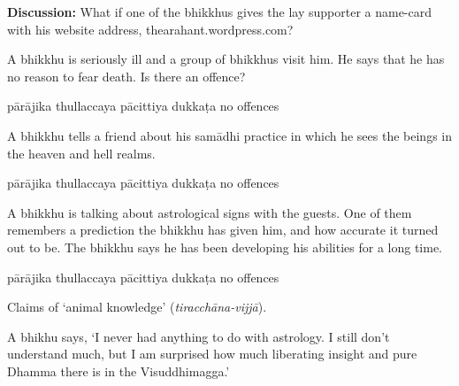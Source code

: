 \begin{exam}{\autoExamName}
\begin{problem*}
\begin{parts}
  \bigskip

  \textbf{Discussion:} What if one of the bhikkhus gives the lay supporter a
  name-card with his website address, thearahant.wordpress.com?

  \bigskip

\item A bhikkhu is seriously ill and a group of bhikkhus visit him. He says that
  he has no reason to fear death. Is there an offence?

  \bigskip

  \begin{answers}{5}
    \bChoices
     pārājika\eAns
     thullaccaya\eAns
     pācittiya\eAns
     dukkaṭa\eAns
     no offences\eAns
    \eChoices
  \end{answers}

  \bigskip

\item A bhikkhu tells a friend about his samādhi practice in which he sees the
  beings in the heaven and hell realms.

  \bigskip

  \begin{answers}{5}
    \bChoices
     pārājika\eAns
     thullaccaya\eAns
     pācittiya\eAns
     dukkaṭa\eAns
     no offences\eAns
    \eChoices
  \end{answers}

  \bigskip

\item A bhikkhu is talking about astrological signs with the guests. One of them
  remembers a prediction the bhikkhu has given him, and how accurate it turned
  out to be. The bhikkhu says he has been developing his abilities for a long time.

  \bigskip

  \begin{answers}{5}
    \bChoices
     pārājika\eAns
     thullaccaya\eAns
     pācittiya\eAns
     dukkaṭa\eAns
     no offences\eAns
    \eChoices
  \end{answers}

  \begin{solution}
    Claims of `animal knowledge' (\emph{tiracchāna-vijjā}).
  \end{solution}

  \bigskip

\item A bhikhu says, `I never had anything to do with astrology.
  I still don't understand much, but I am surprised how much liberating insight
  and pure Dhamma there is in the Visuddhimagga.'


\end{parts}
\end{problem*}
\end{exam}
